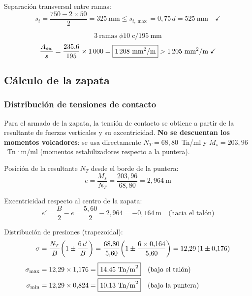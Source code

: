 Separación transversal entre ramas:
\[
  s_t = \frac{750 - 2\times 50}{2} = 325~\text{mm}
  \leq s_{t,\max} = 0{,}75\,d = 525~\text{mm} \quad\checkmark
\]

\begin{resultadobox}
  \[
    3~\text{ramas}\;\phi 10 \;\text{c}/195~\text{mm}
  \]
  \[
    \frac{A_{sw}}{s} = \frac{235{,}6}{195}\times 1\,000
    = \boxed{1\,208~\text{mm}^2/\text{m}} > 1\,205~\text{mm}^2/\text{m}\;\checkmark
  \]
\end{resultadobox}

\subsection{Cálculo de la zapata}
\label{subsec:calculo_zapata}

\subsubsection{Distribución de tensiones de contacto}

Para el armado de la zapata, la tensión de contacto se obtiene
a partir de la resultante de fuerzas verticales y su excentricidad.
\textbf{No se descuentan los momentos volcadores}: se usa directamente
$N_T = 68{,}80$~Tn/ml y $M_s = 203{,}96$~Tn·m/ml (momentos
estabilizadores respecto a la puntera).

Posición de la resultante $N_T$ desde el borde de la puntera:
\begin{equation}
  e = \frac{M_s}{N_T} = \frac{203{,}96}{68{,}80} = 2{,}964~\text{m}
\end{equation}

Excentricidad respecto al centro de la zapata:
\begin{equation}
  e' = \frac{B}{2} - e = \frac{5{,}60}{2} - 2{,}964 = -0{,}164~\text{m}
  \quad\text{(hacia el talón)}
\end{equation}

Distribución de presiones (trapezoidal):
\begin{align}
  \sigma &= \frac{N_T}{B}\!\left(1 \pm \frac{6\,e'}{B}\right)
           = \frac{68{,}80}{5{,}60}\!\left(1 \pm \frac{6\times 0{,}164}{5{,}60}\right)
           = 12{,}29\,(1 \pm 0{,}176) \notag \\[4pt]
  \sigma_{\max} &= 12{,}29 \times 1{,}176
    = \boxed{14{,}45~\text{Tn/m}^2} \quad\text{(bajo el talón)} \\
  \sigma_{\min} &= 12{,}29 \times 0{,}824
    = \boxed{10{,}13~\text{Tn/m}^2} \quad\text{(bajo la puntera)}
\end{align}

